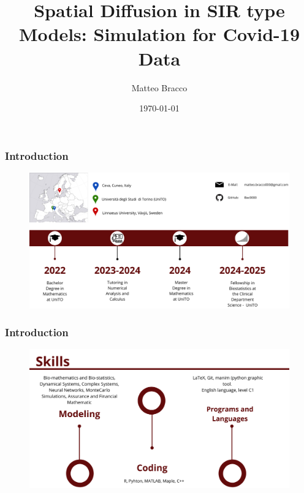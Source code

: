 \documentclass[usenames,dvipsnames]{beamer}
\begin{document}
	\title{ Spatial Diffusion in SIR type Models: Simulation for Covid-19 Data} 
	\author{Matteo Bracco}
	\date{\today}

	\begin{frame}
\maketitle
	
	\end{frame}	

	
	
	
		\begin{frame}
			\frametitle{Introduction}
			\begin{figure}
		\centering
		\includegraphics[width=\textwidth]{myself_1}
	\end{figure}
\end{frame}	

		\begin{frame}
	\frametitle{Introduction}
	\begin{figure}
		\centering
		\includegraphics[width=\textwidth]{myself_2}
	\end{figure}
\end{frame}	
	
\end{document}

